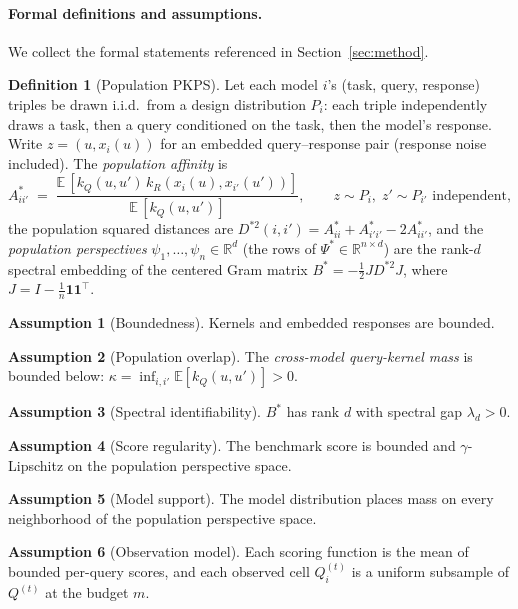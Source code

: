 \documentclass{article}
\theoremstyle{definition}
\newtheorem{definition}{Definition}
\newtheorem{assumption}{Assumption}
\theoremstyle{remark}
\theoremstyle{plain}
\newcommand{\PKPS}{PKPS\xspace}
\begin{document}
\paragraph{Formal definitions and assumptions.} We collect the formal statements referenced in Section~\ref{sec:method}.
\begin{definition}[Population \PKPS]
\label{def:pop}
Let each model $i$'s (task, query, response) triples be drawn i.i.d.\ from a design
distribution $P_i$: each triple independently draws a task, then a query conditioned on
the task, then the model's response. Write $z=(u,x_i(u))$ for an embedded
query--response pair (response noise included). The \emph{population affinity} is
\[
A^*_{ii'}\;=\;\frac{\mathbb{E}\,[k_Q(u,u')\,k_R(x_i(u),x_{i'}(u'))]}{\mathbb{E}\,[k_Q(u,u')]},
\qquad z\sim P_i,\; z'\sim P_{i'} \text{ independent},
\]
the population squared distances are $D^{*2}(i,i')=A^*_{ii}+A^*_{i'i'}-2A^*_{ii'}$, and
the \emph{population perspectives} $\psi_1,\dots,\psi_n\in\mathbb{R}^d$ (the rows of
$\Psi^*\in\mathbb{R}^{n\times d}$) are the rank-$d$ spectral embedding of the centered
Gram matrix $B^*=-\tfrac12 J D^{*2} J$, where $J=I-\tfrac1n\mathbf{1}\mathbf{1}^\top$.
\end{definition}
\begin{assumption}[Boundedness]\label{ass:bound}
Kernels and embedded responses are bounded.
\end{assumption}
\begin{assumption}[Population overlap]\label{ass:overlap}
The \emph{cross-model query-kernel mass} is bounded below:
$\kappa=\inf_{i,i'}\mathbb{E}[k_Q(u,u')]>0$.
\end{assumption}
\begin{assumption}[Spectral identifiability]\label{ass:spec}
$B^*$ has rank $d$ with spectral gap $\lambda_d>0$.
\end{assumption}
\begin{assumption}[Score regularity]\label{ass:score}
The benchmark score is bounded and $\gamma$-Lipschitz on the population perspective space.
\end{assumption}
\begin{assumption}[Model support]\label{ass:support}
The model distribution places mass on every neighborhood of the population perspective
space.
\end{assumption}
\begin{assumption}[Observation model]\label{ass:noise}
Each scoring function is the mean of bounded per-query scores, and each observed cell
$Q_{i}^{(t)}$ is a uniform subsample of $Q^{(t)}$ at the budget $m$.
\end{assumption}
\end{document}
